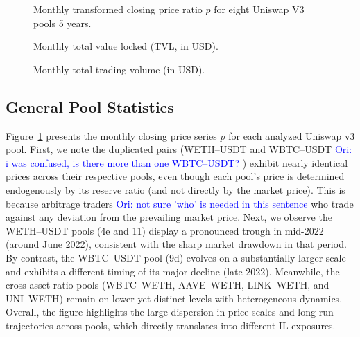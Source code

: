 \documentclass[journal]{IEEEtran}
\newcommand{\ori}[1]{\textcolor{blue}{Ori: #1}}
\begin{document}
\begin{figure}[ht]
    \centering
    
    \caption{Monthly transformed closing price ratio $p$ for eight Uniswap V3 pools 5 years.}
    \label{fig:monthly_pools_transformed}
\end{figure}


\begin{figure}[t]
\centering
\resizebox{0.5\textwidth}{!}{%
    
}
\caption{Monthly total value locked (TVL, in USD).}
\label{fig:monthly_tvl}
\end{figure}




\begin{figure}[ht]
    \centering
    \resizebox{0.5\textwidth}{!}{%
        
    }
    \caption{Monthly total trading volume (in USD).}
    \label{fig:monthly_pools_volume}
\end{figure}




\subsection{General Pool Statistics}
\label{sec:general_statistics}
Figure~\ref{fig:monthly_pools_transformed} presents the monthly closing price series $p$ for each analyzed Uniswap v3 pool. First, we note the duplicated pairs (WETH--USDT and WBTC--USDT \ori{i was confused, is there more than one WBTC--USDT? }) exhibit nearly identical prices across their respective pools, even though each pool’s price is determined endogenously by its reserve ratio (and not directly by the market price). This is because arbitrage traders \ori{not sure 'who' is needed in this sentence} who trade against any deviation from the prevailing market price. Next, we observe the WETH--USDT pools (4e and 11) display a pronounced trough in mid-2022 (around June 2022), consistent with the sharp market drawdown in that period. By contrast, the WBTC--USDT pool (9d) evolves on a substantially larger scale and exhibits a different timing of its major decline (late 2022). Meanwhile, the cross-asset ratio pools (WBTC--WETH, AAVE--WETH, LINK--WETH, and UNI--WETH) remain on lower yet distinct levels with heterogeneous dynamics. Overall, the figure highlights the large dispersion in price scales and long-run trajectories across pools, which directly translates into different IL exposures.
\end{document}
